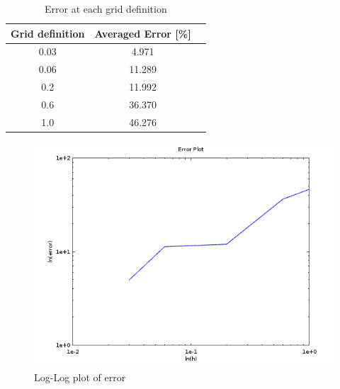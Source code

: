 \documentclass[paper=letter, fontsize=11pt]{scrartcl} %
\numberwithin{equation}{section} %
\numberwithin{figure}{section} %
\numberwithin{table}{section} %
\begin{document}
\begin{table}[h]
\centering
	\begin{tabular}{c c c}
		Grid definition & Averaged Error [\%] \\
		\hline 
		0.03 & 4.971 \\
		0.06 & 11.289 \\
		0.2 & 11.992 \\
		0.6 & 36.370 \\
		1.0 & 46.276 \\
		\hline
	\end{tabular}
	\caption{Error at each grid definition}
	\label{tab:errortabp3}
\end{table}

\begin{figure}[h]
\centering
	\includegraphics[scale=0.45]{q3_errloglog.png}
	\caption{Log-Log plot of error}
	\label{fig:q3_errloglog}
\end{figure}
\end{document}

